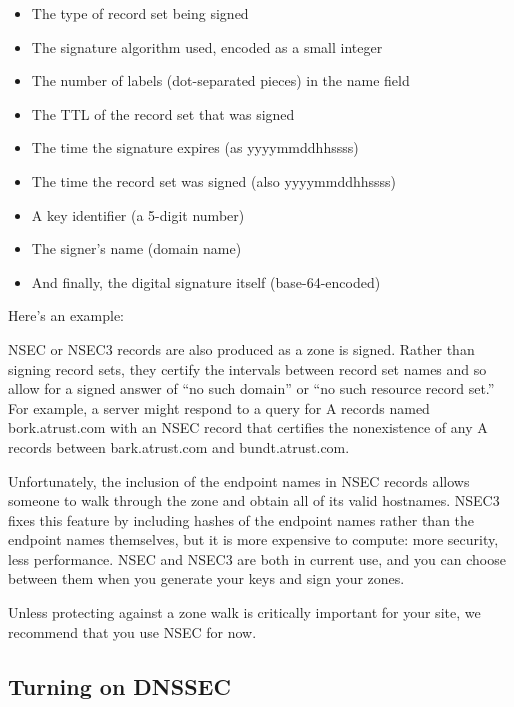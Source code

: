 \begin{itemize}
\tightlist
\item
  The type of record set being signed
\item
  The signature algorithm used, encoded as a small integer
\item
  The number of labels (dot-separated pieces) in the name field
\item
  The TTL of the record set that was signed
\item
  The time the signature expires (as {yyyymmddhhssss})
\item
  The time the record set was signed (also {yyyymmddhhssss})
\item
  A key identifier (a 5-digit number)
\item
  The signer's name (domain name)
\item
  And finally, the digital signature itself (base-64-encoded)
\end{itemize}

Here's an example:


NSEC or NSEC3 records are also produced as a zone is signed. Rather than
signing record sets, they certify the intervals {between} record set
names and so allow for a signed answer of ``no such domain'' or ``no
such resource record set.'' For example, a server might respond to a
query for A records named bork.atrust.com with an NSEC record that
certifies the nonexistence of any A records between {bark.atrust.com}
and bundt.atrust.com.

Unfortunately, the inclusion of the endpoint names in NSEC records
allows someone to walk through the zone and obtain all of its valid
hostnames. NSEC3 fixes this feature by including hashes of the endpoint
names rather than the endpoint names themselves, but it is more
expensive to compute: more security, less performance. NSEC and NSEC3
are both in current use, and you can choose between them when you
generate your keys and sign your zones.

Unless protecting against a zone walk is critically important for your
site, we recommend that you use NSEC for now.

\protect\hypertarget{part0024_split_062.html}{}{}

\hypertarget{part0024_split_062.htmlux5cux23_idContainer1069}{}
\hypertarget{part0024_split_062.htmlux5cux23calibre_pb_61}{%
\subsection[Turning on
DNSSEC]{\texorpdfstring{\protect\hypertarget{part0024_split_062.htmlux5cux23_idTextAnchor941}{}{}Turning
on
DNSSEC}{Turning on DNSSEC}}\label{part0024_split_062.htmlux5cux23calibre_pb_61}}

